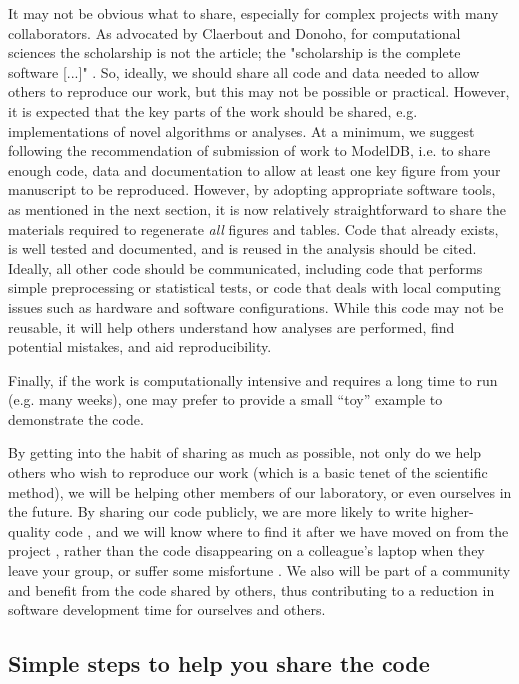 \documentclass[11pt]{article}
\begin{document}
It may not be obvious what to share, especially for complex projects
with many collaborators.  As advocated by Claerbout and Donoho, for
computational sciences the scholarship is not the article; the
"scholarship is the complete software [...]"
\cite{claerbout_electronic_1992,donoho_invitation_2010}.  So, ideally,
we should share all code and data needed to allow others to
reproduce our work, but this may not be possible or practical.
However, it is expected that the key parts of the work should be shared,
e.g. implementations of novel algorithms or analyses.  At a minimum,
we suggest following the recommendation of submission of work to
ModelDB\cite{modeldb}, i.e. to share enough code, data and
documentation to allow at least one key figure from your manuscript to
be reproduced.  However, by adopting appropriate software tools, as
mentioned in the next section, it is now relatively straightforward to
share the materials required to regenerate \textit{all} figures and
tables.  Code that already exists, is well tested and documented, and is reused 
in the analysis should be cited. Ideally, all other code should be 
communicated, including code that performs simple
preprocessing or statistical tests, or code that deals with local
computing issues such as hardware and software configurations. 
While this code may not be reusable, it will help others understand how
analyses are performed, find potential mistakes, and aid reproducibility. 

Finally, if the work is computationally intensive and requires a long
time to run (e.g. many weeks), one may prefer to provide a small ``toy''
example to demonstrate the code.

By getting into the habit of sharing as much as possible, not only do
we help others who wish to reproduce our work (which is a basic
tenet of the scientific method), we will be helping other members of
our laboratory, or even ourselves in the future.  By sharing our code
publicly, we are more likely to write higher-quality code
\cite{Easterbrook2014}, and we will know where to find it after
we have moved on from the project \cite{Halchenko2015}, rather than the
code disappearing on a colleague's laptop when they leave your group, or 
suffer some misfortune \cite{Berg2016}.
We also will be part of a community and benefit from the code shared by
others, thus contributing to a reduction in software development time
for ourselves and others.

\subsection*{Simple steps to help you share the code}
\end{document}
